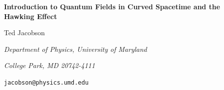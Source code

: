 \documentclass[12pt]{article}
\begin{document}
\def\ad{a^\dagger}

\def\chibar{\bar{\chi}}
\def\G{\Gamma}
\def\L{\Lambda}
\def\oG{|\G|}
\def\Mg{M/\G}
\def\s3g{S^3/\G}
\def\fphi{\varphi}
\def\gsim{\; \raisebox{-.8ex}{$\stackrel{\textstyle >}{\sim}$}\;}
\def\lsim{\; \raisebox{-.8ex}{$\stackrel{\textstyle <}{\sim}$}\;}
\def\beq{\begin{equation}}
\def\eeq{\end{equation}}
\def\bq{\begin{quote}}
\def\eq{\end{quote}}
\def\bea{\begin{eqnarray}}
\def\eea{\end{eqnarray}}
\def\ben{\begin{enumerate}}
\def\een{\end{enumerate}}
\def\bit{\begin{itemize}}
\def\eit{\end{itemize}}
\def\({\left (}
\def\){\right )}
\def\[{\left [}
\def\]{\right ]}
\def\T{{\bf T}}

\def\fphi{\varphi}

\def\g{\gamma}
\def\a{\alpha}
\def\b{\beta}
\def\d{\delta}
\def\k{\kappa}
\def\l{\lambda}
\def\m{\mu}
\def\n{\nu}
\def\r{\rho}
\def\s{\sigma}
\def\o{\omega}
\def\O{\Omega}
\def\S{\Sigma}
\def\t{\tau}
\def\z{\zeta}
\def\D{\Delta }
\def\tphi{\tilde{\fphi}}
\def\ra{\rangle}
\def\la{\langle}
\def\p{\partial}
\def\bx{{\bf x}}
\def\bk{{\bf k}}
\def\bl{{\bf l}}
\def\kdx{\bk\cdot\bx}

\def\R{{\cal R}}
\def\W{{\cal W}}
\def\V{{\cal V}}

\def\half{\textstyle{\frac{1}{2}}}
\bigskip
\hspace*{\fill}
\bigskip\bigskip\bigskip

\begin{center}
\Large \bf Introduction to Quantum Fields in Curved Spacetime
and the Hawking Effect
\end{center}
\bigskip\bigskip\bigskip
\centerline{\large Ted Jacobson}
\medskip
\centerline{\it Department of Physics, University of Maryland}
\centerline{\it College Park, MD 20742-4111}
\centerline{\tt jacobson@physics.umd.edu}

\begin{abstract}
These notes  introduce
the subject of quantum field theory in curved spacetime
and some of its applications
and the questions they raise. Topics include particle creation
in time-dependent metrics, quantum origin of primordial
perturbations, Hawking effect, the trans-Planckian question, 
and Hawking radiation on a lattice.
\vskip 1cm
\begin{center}
{\it Based on 
lectures given at the  CECS School on Quantum Gravity 
in Valdivia, Chile, January 2002.}
\end{center}
\end{abstract}
\end{document}
